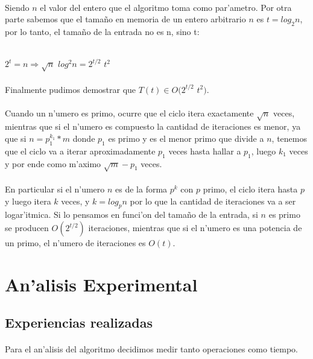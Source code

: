 \paragraph{}
Siendo $n$ el valor del entero que el algoritmo toma como par'ametro. Por otra parte sabemos que 
el tama\~{n}o en memoria de un entero arbitrario $n$ es $t = log_2 n$, por lo tanto, el tama\~{n}o de la entrada no es n, sino t:\\
\\
\centerline{$2^t = n \Rightarrow \sqrt{n}$ $log^2 n = 2^{t/2}$ $t^2$}
\paragraph{}
Finalmente pudimos demostrar que $T(t) \in O(2^{t/2} $ $t^2)$.
\paragraph{}
Cuando un n'umero es primo, ocurre que el ciclo itera exactamente $\sqrt{n}$ veces, mientras que si el n'umero es 
compuesto la cantidad de iteraciones es menor, ya que si $n = p_{1}^{k_{1}}*m$ donde $p_1$ es primo y es el menor 
primo que divide a $n$, tenemos que el ciclo va a iterar aproximadamente $p_1$ veces hasta hallar a $p_1$, luego 
$k_1$ veces y por ende como m'aximo $\sqrt{m}-p_1$ veces.
\paragraph{}
En particular si el n'umero $n$ es de la forma $p^k$ con $p$ primo, el ciclo itera hasta $p$ y luego itera $k$ veces,
y $k=log_p n$ por lo que la cantidad de iteraciones va a ser logar'itmica. Si lo pensamos en funci'on del 
tama\~{n}o de la entrada, si $n$ es primo se producen $O(2^{t/2})$ iteraciones, mientras que si el n'umero es 
una potencia de un primo, el n'umero de iteraciones es $O(t)$.

\section{An'alisis Experimental}
\subsection{Experiencias realizadas}
\paragraph{}
Para el an'alisis del algoritmo decidimos medir tanto operaciones como tiempo. 
